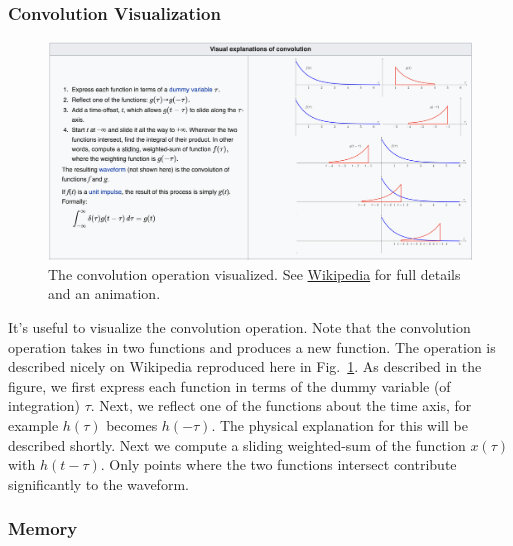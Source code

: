

\subsubsection{Convolution Visualization}

\begin{figure}[tb]
\begin{center}
\includegraphics[width=\columnwidth]{conv_picture.png} 
\end{center}
\caption{The convolution operation visualized.  See \href{https://en.wikipedia.org/wiki/Convolution}{Wikipedia} for full details and an animation. } \label{fig:conv_visual}
\end{figure}


It's useful to visualize the convolution operation.  Note that the convolution operation takes in two functions and produces a new function.  The operation is described nicely on Wikipedia reproduced here in Fig.~\ref{fig:conv_visual}.  As described in the figure, we first express each function in terms of the dummy variable (of integration) $\tau$.  Next, we reflect one of the functions about the time axis, for example $h(\tau)$ becomes $h(-\tau)$.  The physical explanation for this will be described shortly.  Next we compute a sliding weighted-sum of the function $x(\tau)$ with $h(t-\tau)$.  Only points where the two functions intersect contribute significantly to the waveform.  









\subsubsection{Memory}

